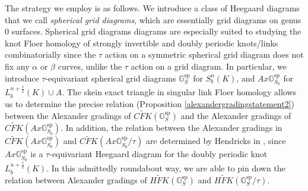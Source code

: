 \documentclass[11pt]{amsart}
\theoremstyle{definition}
\theoremstyle{remark}
\numberwithin{equation}{section}
\begin{document}
The strategy we employ is as follows. We introduce a class of Heegaard diagrams that we call \emph{spherical grid diagrams}, which are essentially grid diagrams on genus $0$ surfaces. Spherical grid diagrams diagrams are especially suited to studying the knot Floer homology of strongly invertible and doubly periodic knots/links combinatorially since the $\tau$ action on a symmetric spherical grid diagram does not fix any $\alpha$ or $\beta$ curves, unlike the $\tau$ action on a grid diagram. In particular, we introduce $\tau$-equivariant spherical grid diagrams $\mathbb{G}_S^\textrm{sp}$ for $S^n_b(K)$, and $Ax\mathbb{G}_{S_0}^\textrm{sp}$ for $L_b^{n+\frac{1}{2}}(K)\cup A$. The skein exact triangle in singular link Floer homology allows us to determine the precise relation (Proposition \ref{alexandergradingstatement2}) between the Alexander gradings of $\widetilde{CFK}(\mathbb{G}_S^{\textrm{sp}})$ and the Alexander gradings of $\widetilde{CFK}(Ax\mathbb{G}_{S_0}^\textrm{sp})$. In addition, the relation between the Alexander gradings in $\widetilde{CFK}(Ax\mathbb{G}_{S_0}^\textrm{sp})$ and $\widetilde{CFK}(Ax\mathbb{G}_{S_0}^\textrm{sp}/\tau)$ are determined by Hendricks in \cite[~Section 3]{HendricksDP}, since $Ax\mathbb{G}_{S_0}^\textrm{sp}$ is a $\tau$-equivariant Heegaard diagram for the doubly periodic knot $L_b^{n+\frac{1}{2}}(K)$. In this admittedly roundabout way, we are able to pin down the relation between Alexander gradings of $\widetilde{HFK}(\mathbb{G}_S^\textrm{sp})$ and $\widetilde{HFK}(\mathbb{G}_S^\textrm{sp}/\tau)$.
\end{document}
